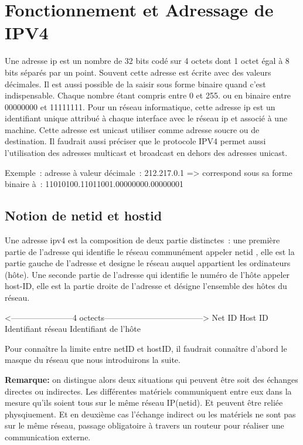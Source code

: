 
\section{Fonctionnement et Adressage de IPV4}
Une adresse ip est un nombre de 32 bits codé sur 4 octets dont 1 octet égal à 8
bits séparés par un point. Souvent cette adresse est écrite avec des valeurs
décimales.  Il est aussi possible de la saisir sous forme binaire quand c’est
indispensable. Chaque nombre étant compris entre 0 et 255. ou en binaire entre
00000000 et 11111111.  Pour un réseau informatique, cette adresse ip est un
identifiant unique attribué à chaque interface avec le réseau ip et associé à
une machine. Cette adresse est unicast utiliser comme adresse soucre ou de
destination. Il faudrait aussi préciser que le protocole IPV4 permet aussi
l’utilisation des adresses multicast et broadcast en dehors des adresses
unicast.

\vspace{1cm}
Exemple : adresse à valeur décimale : 212.217.0.1 => correspond sous sa forme
binaire à : 11010100.11011001.00000000.00000001
\vspace{1cm}

\subsection{Notion de netid et hostid}
Une adresse ipv4 est la composition de deux partie distinctes : une première
partie de l’adresse qui identifie le réseau communément appeler netid , elle
est la partie gauche de l’adresse et designe le réseau auquel appartient les
ordinateurs (hôte).  Une seconde partie de l’adresse qui identifie le numéro de
l’hôte appeler host-ID, elle est la partie droite de l’adresse et désigne
l’ensemble des hôtes du réseau.

\vspace{1cm} 
<-----------------------4 octects------------------------------------>
        Net ID                              Host ID
   Identifiant réseau               Identifiant de l’hôte
\vspace{1cm} 


Pour connaître la limite entre netID et hostID, il faudrait connaître d’abord
le masque du réseau que nous introduirons la suite.

\textbf{ Remarque:} on distingue alors deux situations qui peuvent être soit
des échanges directes ou indirectes.  Les différentes matériels communiquent
entre eux dans la mesure qu’ils soient tous sur le même réseau IP(netid). Et
peuvent être reliée physqiuement.  Et en deuxième cas l’échange indirect ou les
matériels ne sont pas sur le même réseau, passage obligatoire à travers un
routeur pour réaliser une communication externe.   

